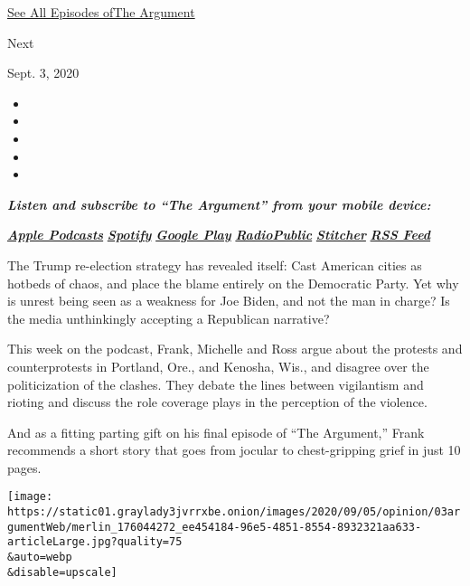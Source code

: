 \href{https://www.nytimes3xbfgragh.onion/column/the-argument}{See All
Episodes ofThe Argument}

Next

Sept. 3, 2020

\begin{itemize}
\item
\item
\item
\item
\item
\end{itemize}

\emph{\textbf{Listen and subscribe to ``The Argument'' from your mobile
device:}}

\textbf{\href{https://itunes.apple.com/us/podcast/the-argument/id1438024613?mt=2}{\emph{Apple
Podcasts}}} \emph{\textbf{\textbar{}}}
\textbf{\href{https://open.spotify.com/show/6bmhSFLKtApYClEuSH8q42}{\emph{Spotify}}}
\emph{\textbf{\textbar{}}}
\textbf{\href{https://play.google.com/music/m/Idxib4hsg3yviao4gtym76knjjy?t=The_Argument}{\emph{Google
Play}}} \emph{\textbf{\textbar{}}}
\textbf{\href{https://radiopublic.com/the-argument-Wdbepr}{\emph{RadioPublic}}}
\emph{\textbf{\textbar{}}}
\textbf{\href{https://www.stitcher.com/podcast/the-new-york-times/the-argument}{\emph{Stitcher}}}
\emph{\textbf{\textbar{}}}
\textbf{\href{https://rss.art19.com/the-argument}{\emph{RSS Feed}}}

The Trump re-election strategy has revealed itself: Cast American cities
as hotbeds of chaos, and place the blame entirely on the Democratic
Party. Yet why is unrest being seen as a weakness for Joe Biden, and not
the man in charge? Is the media unthinkingly accepting a Republican
narrative?

This week on the podcast, Frank, Michelle and Ross argue about the
protests and counterprotests in Portland, Ore., and Kenosha, Wis., and
disagree over the politicization of the clashes. They debate the lines
between vigilantism and rioting and discuss the role coverage plays in
the perception of the violence.

And as a fitting parting gift on his final episode of ``The Argument,''
Frank recommends a short story that goes from jocular to chest-gripping
grief in just 10 pages.

\texttt{[image: https://static01.graylady3jvrrxbe.onion/images/2020/09/05/opinion/03argumentWeb/merlin\_176044272\_ee454184-96e5-4851-8554-8932321aa633-articleLarge.jpg?quality=75\\\&auto=webp\\\&disable=upscale]}

